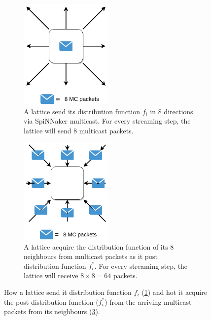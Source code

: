 \begin{figure}[!tb]

\begin{subfigure}[b]{0.5\textwidth}
       \centering
       \includegraphics[width=0.5\textwidth]{figures/send.png}
       \caption{A lattice send its distribution function $f_i$ in 8 directions via SpiNNaker multicast. For every streaming step, the lattice will send 8 multicast packets.}
       \label{fig:spinn_send}
   \end{subfigure}
   \begin{subfigure}[b]{0.5\textwidth}
   \centering
       \includegraphics[width=0.5\textwidth]{figures/receive.png}
       \caption{A lattice acquire the distribution function of its 8 neighbours from multicast packets as it post distribution function $f_i^{*}$. For every streaming step, the lattice will receive $8\times8=64$ packets.}
       \label{fig:spinn_receive}
   \end{subfigure}
   \caption{How a lattice send it distribution function $f_i$ (\ref{fig:spinn_send}) and hot it acquire the post distribution function ($f_i^{*}$) from the arriving multicast packets from its neighbours (\ref{fig:spinn_receive}).}
\end{figure}


